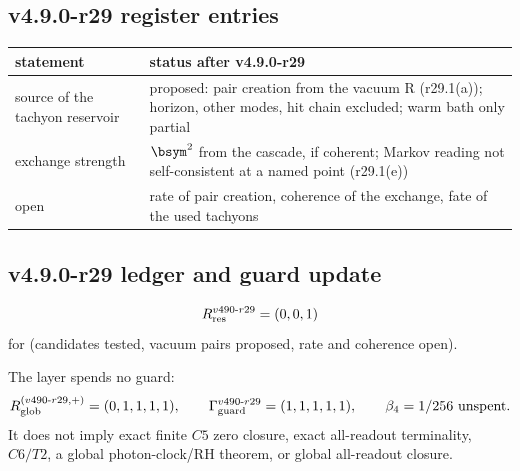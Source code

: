 \subsection*{v4.9.0-r29 register entries}
\label{subsec:v490-r29-register}

\begin{center}
\small
\begin{tabular}{@{}>{\raggedright\arraybackslash}p{}>{\raggedright\arraybackslash}p{}@{}}
\toprule
statement & status after v4.9.0-r29\\
\midrule
source of the tachyon reservoir & proposed: pair creation from the vacuum R (r29.1(a)); horizon, other modes, hit chain excluded; warm bath only partial\\
exchange strength & \(\bsym^2\) from the cascade, if coherent; Markov reading not self-consistent at a named point (r29.1(e))\\
open & rate of pair creation, coherence of the exchange, fate of the used tachyons\\
\bottomrule
\end{tabular}
\end{center}

\subsection*{v4.9.0-r29 ledger and guard update}
\label{subsec:v490-r29-ledger-guard}

\[
R_{\rm res}^{v490\text{-}r29}=(0,0,1)
\]
for (candidates tested, vacuum pairs proposed, rate and coherence open).

The layer spends no guard:
\[
R_{\rm glob}^{(v490\text{-}r29,+)}=(0,1,1,1,1),
\qquad
\Gamma_{\rm guard}^{v490\text{-}r29}=(1,1,1,1,1),
\qquad
\beta_4=1/256\ \text{unspent}.
\]
It does not imply exact finite \(C5\) zero closure, exact all-readout terminality,
\(C6/T2\), a global photon-clock/RH theorem, or global all-readout closure.

